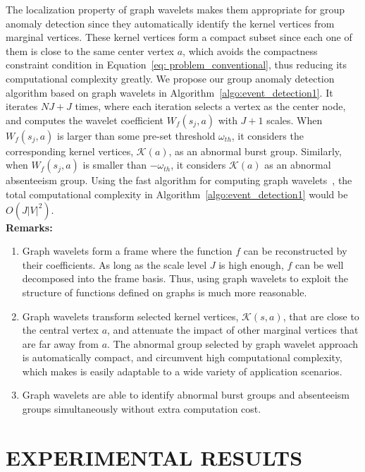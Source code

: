 The localization property of graph wavelets makes them appropriate for group anomaly detection since they automatically identify the kernel vertices from marginal vertices. These kernel vertices form a compact subset since each one of them is close to the same center vertex $a$, which avoids the compactness constraint condition in Equation~\ref{eq: problem_conventional}, thus reducing
its computational complexity greatly. We propose our group anomaly detection algorithm based on graph wavelets in Algorithm~\ref{algo:event_detection1}. It iterates $NJ+J$ times, where each iteration selects a vertex as the center node, and computes the wavelet coefficient $W_f(s_j, a)$ with $J+1$ scales. When $W_f(s_j, a)$ is larger than some pre-set threshold $\omega_{th}$, it considers the corresponding kernel vertices, $\mathcal{K}(a)$, as an abnormal burst group. Similarly, when $W_f(s_j, a)$ is smaller than $-\omega_{th}$, it considers $\mathcal{K}(a)$ as an abnormal absenteeism group. Using the fast algorithm for computing graph wavelets~\cite{hammond2011wavelets}, the total computational complexity in Algorithm~\ref{algo:event_detection1}  would be $O(J|V|^2)$.\\

\noindent
{\textbf{Remarks:}}
\begin{enumerate}
\item Graph wavelets form a frame where the function $f$ can be reconstructed by their coefficients.
As long as the scale level $J$ is high enough, $f$ can be well decomposed into the frame basis. Thus, using graph wavelets to exploit the structure of functions defined on graphs is much more reasonable.
\item Graph wavelets transform selected kernel vertices, $\mathcal{K}(s,a)$, that are close to the central vertex $a$, and attenuate the impact of other marginal vertices that are far away from $a$. The abnormal group selected by graph wavelet approach is automatically compact, and circumvent high computational complexity, which makes is easily adaptable to a wide variety of application scenarios.
\item Graph wavelets are able to identify abnormal burst groups and absenteeism groups simultaneously without extra computation cost.
\end{enumerate}



\section{EXPERIMENTAL RESULTS} \label{sec:experiment}


